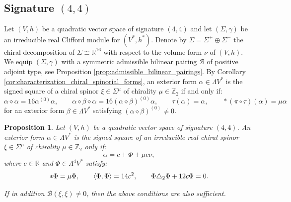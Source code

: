 \documentclass[10pt,reqno]{amsart}
\newtheorem{proposition}[theorem]{Proposition}
\theoremstyle{definition}
\theoremstyle{remark}
\newcommand{\Z}{\mathbb{Z}}
\newcommand{\R}{\mathbb{R}}
\DeclarePairedDelimiter{\escal}{\langle}{\rangle}
\begin{document}
\subsection{Signature \texorpdfstring{$(4,4)$}{(4,4)}}

Let $(V,h)$ be a quadratic vector space of signature $(4,4)$ and let $(\Sigma,\gamma)$ be an irreducible real Clifford module for $(V^*,h^*)$. Denote by $\Sigma=\Sigma^+\oplus\Sigma^-$ the chiral decomposition of $\Sigma\cong\R^{16}$ with respect to the volume form $\nu$ of $(V,h)$. We equip $(\Sigma,\gamma)$ with a symmetric admissible bilinear pairing $\mathscr{B}$ of positive adjoint type, see Proposition \ref{prop:admissible_bilinear_pairings}. By Corollary \ref{cor:characterization_chiral_spinorial_forms}, an exterior form $\alpha\in\Lambda V^*$ is the signed square of a chiral spinor $\xi\in\Sigma^\mu$ of chirality $\mu\in\Z_2$ if and only if: $$\alpha\diamond\alpha=16\alpha^{(0)}\alpha,\qquad \alpha\diamond\beta\diamond\alpha=16(\alpha\diamond\beta)^{(0)}\alpha,\qquad\tau(\alpha)=\alpha,\qquad*(\pi\circ\tau)(\alpha)=\mu\alpha$$ for an exterior form $\beta\in\Lambda V^*$ satisfying $(\alpha\diamond\beta)^{(0)}\neq0$.

\begin{proposition}\label{prop:square_(4,4)}
    Let $(V,h)$ be a quadratic vector space of signature $(4,4)$. An exterior form $\alpha\in\Lambda V^*$ is the signed square of an irreducible real chiral spinor $\xi\in\Sigma^\mu$ of chirality $\mu\in\Z_2$ only if: $$\alpha=c+\Phi+\mu c\nu,$$ where $c\in\R$ and $\Phi\in\Lambda^4V^*$ satisfy: \begin{equation}\label{eq:Spin(4,3)-structure_intrinsic}
        *\Phi=\mu\Phi,\qquad \escal{\Phi,\Phi}=14c^2,\qquad \Phi\triangle_2\Phi+12c\Phi=0.
    \end{equation}
    
    If in addition $\mathscr{B}(\xi,\xi)\neq0$, then the above conditions are also sufficient.
\end{proposition}
\end{document}
